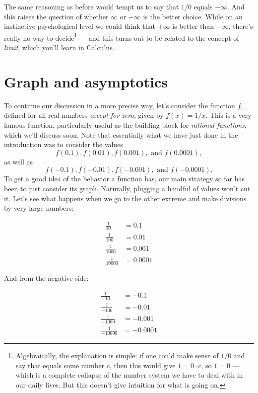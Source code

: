 \documentclass{ximera}
\begin{document}
The same reasoning as before would tempt us to say that $1/0$ equals $-\infty$. And this raises the question of whether $\infty$ or $-\infty$ is the better choice. While on an instinctive psychological level we could think that $+\infty$ is better than $-\infty$, there's really no way to decide\footnote{Algebraically, the explanation is simple: if one could make sense of $1/0$ and say that equals some number $c$, then this would give $1 = 0 \cdot c$, so $1 = 0$ --- which is a complete collapse of the number system we have to deal with in our daily lives. But this doesn't give intuition for what is going on.} --- and this turns out to be related to the concept of \emph{limit}, which you'll learn in Calculus.

\section{Graph and asymptotics}

To continue our discussion in a more precise way, let's consider the function $f$, defined for all real numbers \emph{except for zero}, given by $f(x) = 1/x$. This is a very famous function, particularly useful as the building block for \emph{rational functions}, which we'll discuss soon. Note that essentially what we have just done in the introduction was to consider the values $$   f(0.1), f(0.01), f(0.001), \mbox{ and } f(0.0001),$$as well as $$f(-0.1), f(-0.01), f(-0.001), \mbox{ and } f(-0.0001).  $$
To get a good idea of the behavior a function has, our main strategy so far has been to just consider its graph. Naturally, plugging a handful of values won't cut it. Let's see what happens when we go to the other extreme and make divisions by very large numbers:

\begin{align*}
  \frac{1}{10} &= 0.1 \\ \frac{1}{100} &= 0.01 \\ \frac{1}{1000} &= 0.001 \\ \frac{1}{10000} &= 0.0001
\end{align*}

And from the negative side:

\begin{align*}
  \frac{1}{-10} &= -0.1 \\ \frac{1}{-100} &= -0.01 \\ \frac{1}{-1000} &= -0.001 \\ \frac{1}{-10000} &= -0.0001
\end{align*}
\end{document}
